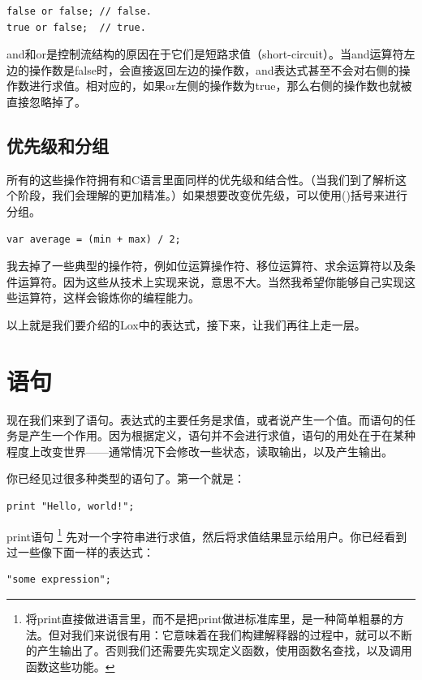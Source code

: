 \documentclass[cn,10pt,math=newtx,citestyle=gb7714-2015,bibstyle=gb7714-2015]{elegantbook}
\begin{document}
\begin{verbatim}
false or false; // false.
true or false;  // true.
\end{verbatim}

and和or是控制流结构的原因在于它们是短路求值（short-circuit）。当and运算符左边的操作数是false时，会直接返回左边的操作数，and表达式甚至不会对右侧的操作数进行求值。相对应的，如果or左侧的操作数为true，那么右侧的操作数也就被直接忽略掉了。

\subsection{优先级和分组}

所有的这些操作符拥有和C语言里面同样的优先级和结合性。（当我们到了解析这个阶段，我们会理解的更加精准。）如果想要改变优先级，可以使用()括号来进行分组。

\begin{verbatim}
var average = (min + max) / 2;
\end{verbatim}

我去掉了一些典型的操作符，例如位运算操作符、移位运算符、求余运算符以及条件运算符。因为这些从技术上实现来说，意思不大。当然我希望你能够自己实现这些运算符，这样会锻炼你的编程能力。

以上就是我们要介绍的Lox中的表达式，接下来，让我们再往上走一层。

\section{语句}

现在我们来到了语句。表达式的主要任务是求值，或者说产生一个值。而语句的任务是产生一个作用。因为根据定义，语句并不会进行求值，语句的用处在于在某种程度上改变世界——通常情况下会修改一些状态，读取输出，以及产生输出。

你已经见过很多种类型的语句了。第一个就是：

\begin{verbatim}
print "Hello, world!";
\end{verbatim}

print语句 \footnote{将print直接做进语言里，而不是把print做进标准库里，是一种简单粗暴的方法。但对我们来说很有用：它意味着在我们构建解释器的过程中，就可以不断的产生输出了。否则我们还需要先实现定义函数，使用函数名查找，以及调用函数这些功能。} 先对一个字符串进行求值，然后将求值结果显示给用户。你已经看到过一些像下面一样的表达式：

\begin{verbatim}
"some expression";
\end{verbatim}
\end{document}
